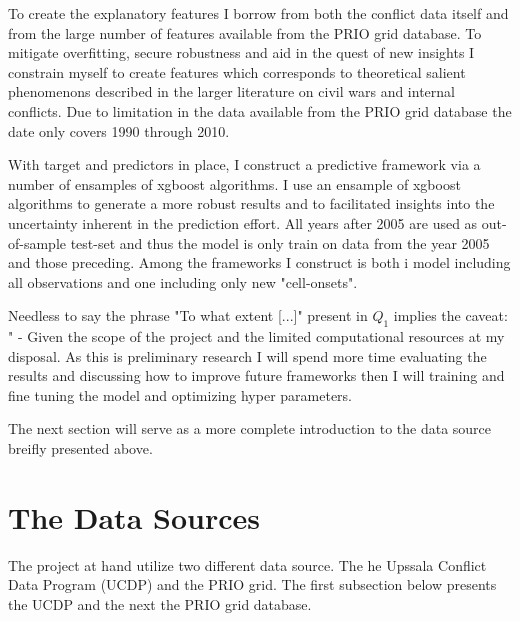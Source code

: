 \documentclass[a4paper]{article}
\begin{document}
To create the explanatory features I borrow from both the conflict data itself and from the large number of features available from the PRIO grid database. To mitigate overfitting, secure robustness and aid in the quest of new insights I constrain myself to create features which corresponds to theoretical salient phenomenons described in the larger literature on civil wars and internal conflicts. Due to limitation in the data available from the PRIO grid database the date only covers 1990 through 2010.\par

With target and predictors in place, I construct a predictive framework via a number of ensamples of xgboost algorithms. I use an ensample of xgboost algorithms to generate a more robust results and to facilitated insights into the uncertainty inherent in the prediction effort. All years after 2005 are used as out-of-sample test-set and thus the model is only train on data from the year 2005 and those preceding. Among the frameworks I construct is both i model including all observations and one including only new "cell-onsets".\par


Needless to say the phrase "To what extent [...]" present in $Q_1$ implies the caveat: " - Given the scope of the project and the limited computational resources at my disposal. As this is preliminary research I will spend more time evaluating the results and discussing how to improve future frameworks then I will training and fine tuning the model and optimizing hyper parameters.\par 

The next section will serve as a more complete introduction to the data source breifly presented above.\par

\section{The Data Sources} %

The project at hand utilize two different data source. The he Upssala Conflict Data Program (UCDP) \citep{Sundberg_2013, Croicu_Sundberg_2017} and the PRIO grid\citep{Tollefsen_2012}. The first subsection below presents the UCDP and the next the PRIO grid database.\par
\end{document}
